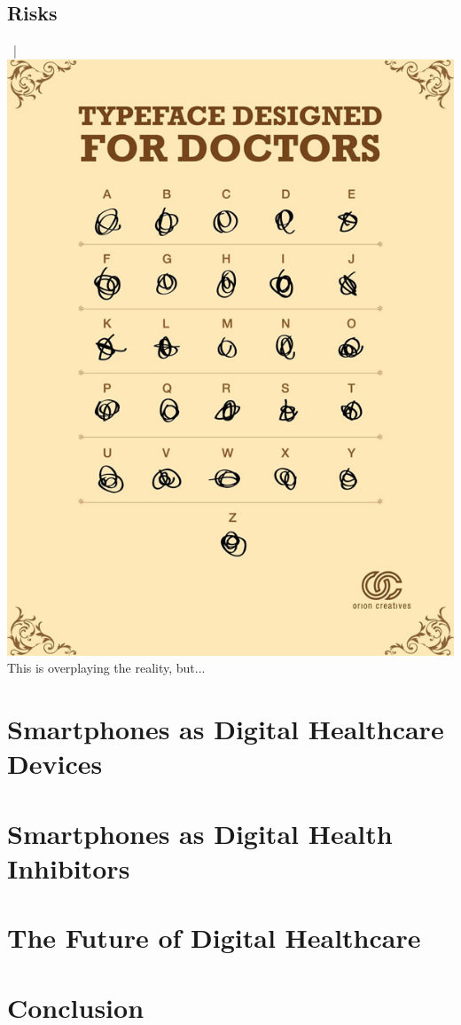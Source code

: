 \documentclass[xcolor=dvipsnames, aspectratio=1610]{beamer}
\begin{document}
\subsection{Risks}%
\label{sub:risks}

\begin{frame}{\secname\ | \subsecname}
    \centering
    \includegraphics[height=0.8\textheight]{../media/doctor_handwriting.jpg} \\
    \small{This is overplaying the reality, but...}
\end{frame}

\section{Smartphones as Digital Healthcare Devices}%
\label{sec:smartphones_as_digital_healthcare_devices}

\section{Smartphones as Digital Health Inhibitors}%
\label{sec:smartphones_as_digital_health_inhibitors}

\section{The Future of Digital Healthcare}%
\label{sec:the_future_of_digital_healthcare}

\section{Conclusion}%
\label{sec:conclusion}

\end{document}
